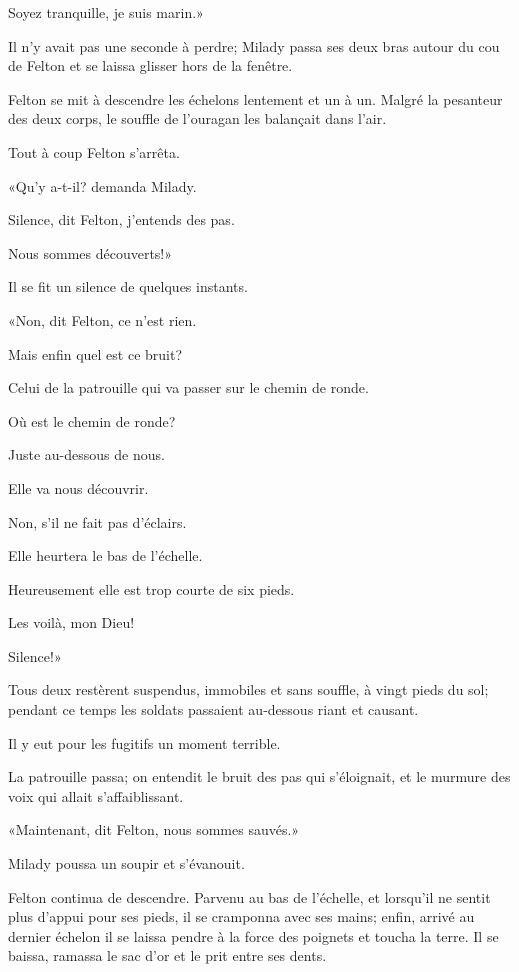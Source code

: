 \speak  Soyez tranquille, je suis marin.» 

Il n'y avait pas une seconde à perdre; Milady passa ses deux bras autour du cou de Felton et se laissa glisser hors de la fenêtre. 

Felton se mit à descendre les échelons lentement et un à un. Malgré la pesanteur des deux corps, le souffle de l'ouragan les balançait dans l'air. 

Tout à coup Felton s'arrêta. 

«Qu'y a-t-il? demanda Milady. 

\speak  Silence, dit Felton, j'entends des pas. 

\speak  Nous sommes découverts!» 

Il se fit un silence de quelques instants. 

«Non, dit Felton, ce n'est rien. 

\speak  Mais enfin quel est ce bruit? 

\speak  Celui de la patrouille qui va passer sur le chemin de ronde. 

\speak  Où est le chemin de ronde? 

\speak  Juste au-dessous de nous. 

\speak  Elle va nous découvrir. 

\speak  Non, s'il ne fait pas d'éclairs. 

\speak  Elle heurtera le bas de l'échelle. 

\speak  Heureusement elle est trop courte de six pieds. 

\speak  Les voilà, mon Dieu! 

\speak  Silence!» 

Tous deux restèrent suspendus, immobiles et sans souffle, à vingt pieds du sol; pendant ce temps les soldats passaient au-dessous riant et causant. 

Il y eut pour les fugitifs un moment terrible. 

La patrouille passa; on entendit le bruit des pas qui s'éloignait, et le murmure des voix qui allait s'affaiblissant. 

«Maintenant, dit Felton, nous sommes sauvés.» 

Milady poussa un soupir et s'évanouit. 

Felton continua de descendre. Parvenu au bas de l'échelle, et lorsqu'il ne sentit plus d'appui pour ses pieds, il se cramponna avec ses mains; enfin, arrivé au dernier échelon il se laissa pendre à la force des poignets et toucha la terre. Il se baissa, ramassa le sac d'or et le prit entre ses dents. 

